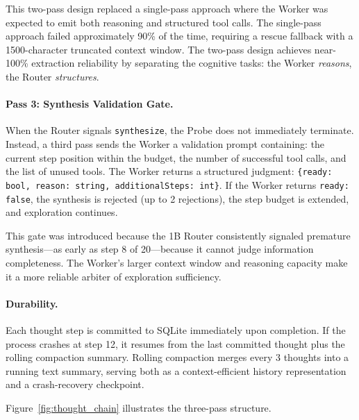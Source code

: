 \documentclass{article}
\begin{document}
This two-pass design replaced a single-pass approach where the Worker was expected to emit both reasoning and structured tool calls.
The single-pass approach failed approximately 90\% of the time, requiring a rescue fallback with a 1500-character truncated context window.
The two-pass design achieves near-100\% extraction reliability by separating the cognitive tasks: the Worker \emph{reasons}, the Router \emph{structures}.

\paragraph{Pass 3: Synthesis Validation Gate.}
\label{sec:synthesis_gate}
When the Router signals \texttt{synthesize}, the Probe does not immediately terminate.
Instead, a third pass sends the Worker a validation prompt containing: the current step position within the budget, the number of successful tool calls, and the list of unused tools.
The Worker returns a structured judgment: \texttt{\{ready: bool, reason: string, additionalSteps: int\}}.
If the Worker returns \texttt{ready: false}, the synthesis is rejected (up to 2 rejections), the step budget is extended, and exploration continues.

This gate was introduced because the 1B Router consistently signaled premature synthesis---as early as step 8 of 20---because it cannot judge information completeness.
The Worker's larger context window and reasoning capacity make it a more reliable arbiter of exploration sufficiency.

\paragraph{Durability.}
Each thought step is committed to SQLite immediately upon completion.
If the process crashes at step 12, it resumes from the last committed thought plus the rolling compaction summary.
Rolling compaction merges every 3 thoughts into a running text summary, serving both as a context-efficient history representation and a crash-recovery checkpoint.

Figure~\ref{fig:thought_chain} illustrates the three-pass structure.
\end{document}
